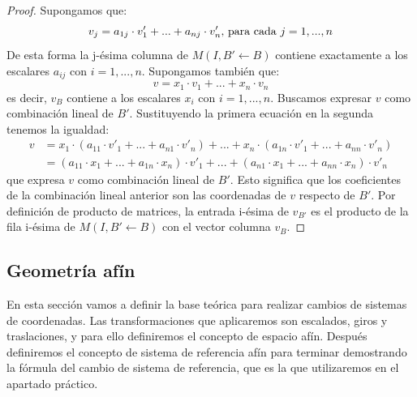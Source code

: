 \documentclass[a4paper,11pt, oneside]{book}
\begin{document}
\begin{proof}
	Supongamos que:
	\begin{equation}
	v_j = a_{1j}\cdot v'_1 +...+ a_{nj}\cdot v'_n\textup{, para cada }j = 1,...,n
	\end{equation}
	De esta forma la j-ésima columna de $M(I, B' \leftarrow B)$  contiene exactamente a los escalares $a_{ij}$ con $i=1,...,n$. Supongamos también que:
	\begin{equation}
	v = x_1\cdot v_1+...+x_n\cdot v_n
	\end{equation}
	es decir, $v_B$ contiene a los escalares $x_i$ con $i=1,...,n$. Buscamos expresar $v$ como combinación lineal de $B'$. Sustituyendo la primera ecuación en la segunda tenemos la igualdad:
	\begin{equation}
	\begin{split}
	v &= x_1\cdot (a_{11}\cdot v'_{1}+...+a_{n1}\cdot v'_n)+...+x_n\cdot (a_{1n}\cdot v'_1+...+a_{nn}\cdot v'_n) \\
	 &= 
	 (a_{11}\cdot x_1+...+a_{1n}\cdot x_n)\cdot v'_1 +...+(a_{n1}\cdot x_1+...+a_{nn}\cdot x_n)\cdot v'_n
	 \end{split}
	\end{equation}
	que expresa $v$ como combinación lineal de $B'$. Esto significa que los coeficientes de la combinación lineal anterior son las coordenadas de $v$ respecto de $B'$. Por definición de producto de matrices, la entrada i-ésima de $v_{B'}$ es el producto de la fila i-ésima de $M(I, B' \leftarrow B)$ con el vector columna $v_B$.
\end{proof}

\subsection{Geometría afín}

En esta sección vamos a definir la base teórica para realizar cambios de sistemas de coordenadas. Las transformaciones que aplicaremos son escalados, giros y traslaciones, y para ello definiremos el concepto de espacio afín. Después definiremos el concepto de sistema de referencia afín para terminar demostrando la fórmula del cambio de sistema de referencia, que es la que utilizaremos en el apartado práctico.
\end{document}
